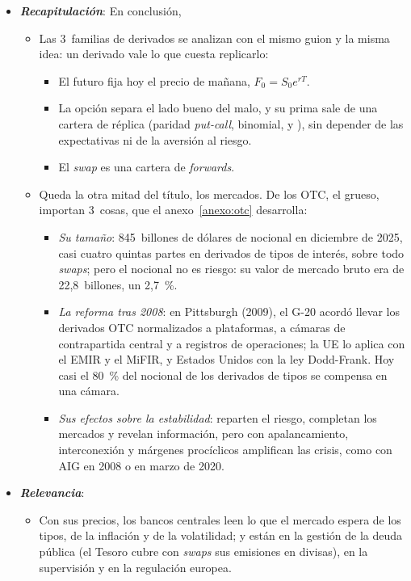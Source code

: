 \documentclass[11pt]{article}
\begin{document}
\begin{itemize}
\item \textbf{\emph{Recapitulación}}: En conclusión,
  \begin{itemize}
  \item Las 3~familias de derivados se analizan con el mismo guion y la misma idea: un derivado vale lo que cuesta replicarlo:
    \begin{itemize}
    \item El futuro fija hoy el precio de mañana, $F_0=S_0e^{rT}$.
    \item La opción separa el lado bueno del malo, y su prima sale de una cartera de réplica (paridad \emph{put-call}, binomial,  y ), sin depender de las expectativas ni de la aversión al riesgo.
    \item El \emph{swap} es una cartera de \emph{forwards}.
    \end{itemize}
  \item Queda la otra mitad del título, los mercados. De los OTC, el grueso, importan 3~cosas, que el anexo~\ref{anexo:otc} desarrolla:
  \begin{itemize}
  \item \emph{Su tamaño}: 845~billones de dólares de nocional en diciembre de 2025, casi cuatro quintas partes en derivados de tipos de interés, sobre todo \emph{swaps}; pero el nocional no es riesgo: su valor de mercado bruto era de 22,8~billones, un 2,7~\%\nocite{BIS2026OTCDerivados}.
  \item \emph{La reforma tras 2008}: en Pittsburgh (2009), el G-20 acordó llevar los derivados OTC normalizados a plataformas, a cámaras de contrapartida central y a registros de operaciones\nocite{G20Pittsburgh2009}; la UE lo aplica con el EMIR y el MiFIR, y Estados Unidos con la ley Dodd-Frank. Hoy casi el 80~\% del nocional de los derivados de tipos se compensa en una cámara.
  \item \emph{Sus efectos sobre la estabilidad}: reparten el riesgo, completan los mercados y revelan información, pero con apalancamiento, interconexión y márgenes procíclicos amplifican las crisis, como con AIG en 2008 o en marzo de 2020.
  \end{itemize}
  \end{itemize}
\item \textbf{\emph{Relevancia}}:
  \begin{itemize}
  \item Con sus precios, los bancos centrales leen lo que el mercado espera de los tipos, de la inflación y de la volatilidad; y están en la gestión de la deuda pública (el Tesoro cubre con \emph{swaps} sus emisiones en divisas), en la supervisión y en la regulación europea.

\end{itemize}
\end{itemize}
\end{document}
